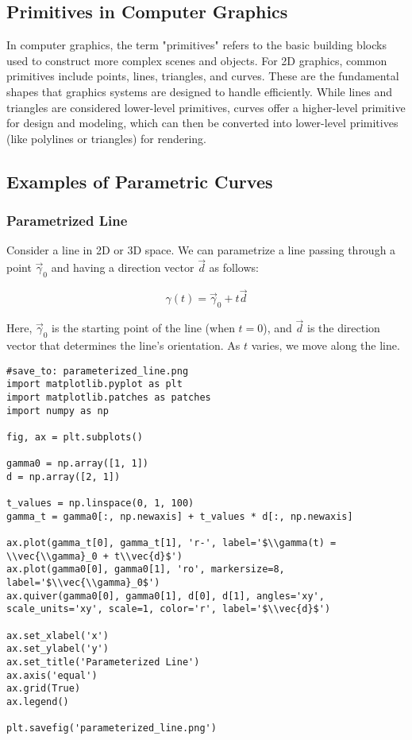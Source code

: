 \documentclass{article}
\begin{document}
\subsection{Primitives in Computer Graphics}

In computer graphics, the term "primitives" refers to the basic building blocks used to construct more complex scenes and objects. For 2D graphics, common primitives include points, lines, triangles, and curves.  These are the fundamental shapes that graphics systems are designed to handle efficiently.  While lines and triangles are considered lower-level primitives, curves offer a higher-level primitive for design and modeling, which can then be converted into lower-level primitives (like polylines or triangles) for rendering.

\subsection{Examples of Parametric Curves}

\subsubsection{Parametrized Line}

Consider a line in 2D or 3D space. We can parametrize a line passing through a point \(\vec{\gamma}_0\) and having a direction vector \(\vec{d}\) as follows:

\begin{equation}
\gamma(t) = \vec{\gamma}_0 + t\vec{d}
\end{equation}

Here, \(\vec{\gamma}_0\) is the starting point of the line (when \(t=0\)), and \(\vec{d}\) is the direction vector that determines the line's orientation. As \(t\) varies, we move along the line.

\begin{verbatim}
#save_to: parameterized_line.png
import matplotlib.pyplot as plt
import matplotlib.patches as patches
import numpy as np

fig, ax = plt.subplots()

gamma0 = np.array([1, 1])
d = np.array([2, 1])

t_values = np.linspace(0, 1, 100)
gamma_t = gamma0[:, np.newaxis] + t_values * d[:, np.newaxis]

ax.plot(gamma_t[0], gamma_t[1], 'r-', label='$\\gamma(t) = \\vec{\\gamma}_0 + t\\vec{d}$')
ax.plot(gamma0[0], gamma0[1], 'ro', markersize=8, label='$\\vec{\\gamma}_0$')
ax.quiver(gamma0[0], gamma0[1], d[0], d[1], angles='xy', scale_units='xy', scale=1, color='r', label='$\\vec{d}$')

ax.set_xlabel('x')
ax.set_ylabel('y')
ax.set_title('Parameterized Line')
ax.axis('equal')
ax.grid(True)
ax.legend()

plt.savefig('parameterized_line.png')
\end{verbatim}
\end{document}
